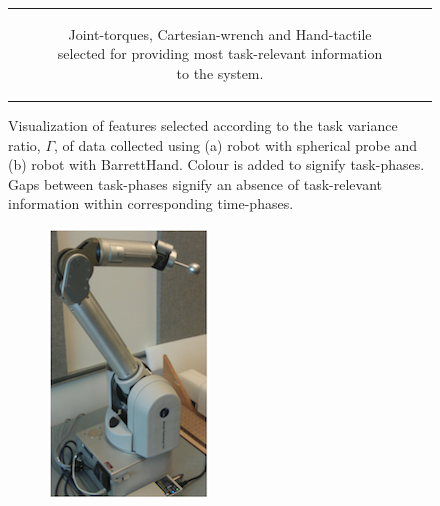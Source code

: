 \begin{figure}[]
\begin{center}
\begin{tabular}{c}
\begin{subfigure}[]{0.78\linewidth}
            \caption{Joint-torques, Cartesian-wrench and Hand-tactile selected for providing most task-relevant information to the system.}
            \label{fig:tvr_table_h}
        \end{subfigure}
    \end{tabular}
    \end{center}
    \caption{Visualization of features selected according to the task variance ratio, $\Gamma$, of data collected using (a) robot with spherical probe and (b) robot with BarrettHand. Colour is added to signify task-phases. Gaps between task-phases signify an absence of task-relevant information within corresponding time-phases.}
    \label{fig:tvr_tables}
\end{figure}

\begin{figure}[]
    \begin{subfigure}[]{0.438\linewidth}
        \includegraphics[width=\linewidth]{images/wam_p}

\end{subfigure}
\end{figure}
